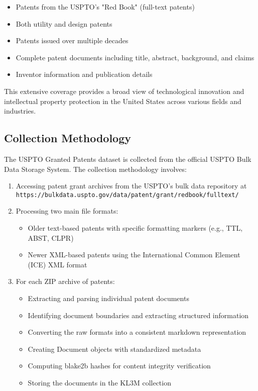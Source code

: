 \begin{itemize}
  \item Patents from the USPTO's "Red Book" (full-text patents)
  \item Both utility and design patents
  \item Patents issued over multiple decades
  \item Complete patent documents including title, abstract, background, and claims
  \item Inventor information and publication details
\end{itemize}

This extensive coverage provides a broad view of technological innovation and intellectual property protection in the United States across various fields and industries.

\subsection{Collection Methodology}

The USPTO Granted Patents dataset is collected from the official USPTO Bulk Data Storage System. The collection methodology involves:

\begin{enumerate}
    \item Accessing patent grant archives from the USPTO's bulk data repository at \texttt{https://bulkdata.uspto.gov/data/patent/grant/redbook/fulltext/}
    
    \item Processing two main file formats:
    \begin{itemize}
        \item Older text-based patents with specific formatting markers (e.g., TTL, ABST, CLPR)
        \item Newer XML-based patents using the International Common Element (ICE) XML format
    \end{itemize}
    
    \item For each ZIP archive of patents:
    \begin{itemize}
        \item Extracting and parsing individual patent documents
        \item Identifying document boundaries and extracting structured information
        \item Converting the raw formats into a consistent markdown representation
        \item Creating Document objects with standardized metadata
        \item Computing blake2b hashes for content integrity verification
        \item Storing the documents in the KL3M collection
    \end{itemize}
\end{enumerate}

